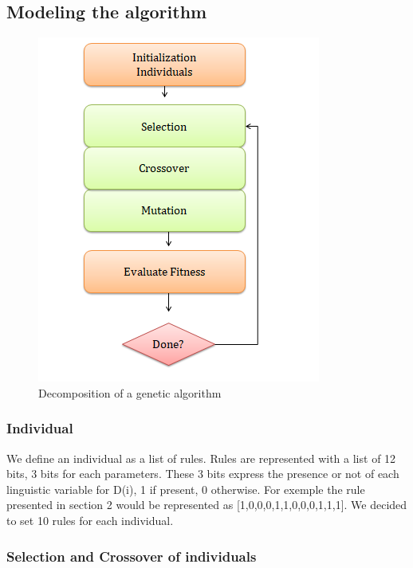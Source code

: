 \documentclass[a4paper,12pt]{article}
\begin{document}
\subsection{Modeling the algorithm}


\begin{figure}
\includegraphics[scale=0.5]{genealgo}
\centering
\caption{Decomposition of a genetic algorithm}
\end{figure}

\subsubsection{Individual}

We define an individual as a list of rules. Rules are represented with a list of 12 bits, 3 bits for each parameters.
These 3 bits express the presence or not of each linguistic variable for D(i), 1 if present, 0 otherwise.
For exemple the rule presented in section 2 would be represented as [1,0,0,0,1,1,0,0,0,1,1,1].
We decided to set 10 rules for each individual.

\subsubsection{Selection and Crossover of individuals}
\end{document}

